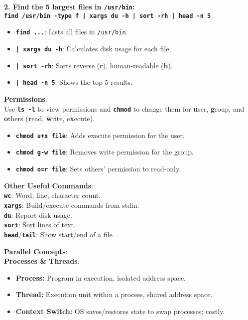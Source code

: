 \documentclass[10pt, a4paper]{article}
\newcommand{\cmd}[1]{\texttt{\textbf{#1}}}
\begin{document}
\begin{multicols}{3}
\vspace{1em} %

\textbf{2. Find the 5 largest files in \texttt{/usr/bin}:} \\
\cmd{find /usr/bin -type f | xargs du -h | sort -rh | head -n 5}
\begin{itemize}[nosep] %
    \item \cmd{find ...}: Lists all files in \texttt{/usr/bin}.
    \item \cmd{| xargs du -h}: Calculates disk usage for each file.
    \item \cmd{| sort -rh}: Sorts reverse (\textbf{r}), human-readable (\textbf{h}).
    \item \cmd{| head -n 5}: Shows the top 5 results.
\end{itemize}

\textbf{Permissions}: \\
Use \cmd{ls -l} to view permissions and \cmd{chmod} to change them for \textbf{u}ser, \textbf{g}roup, and \textbf{o}thers (\textbf{r}ead, \textbf{w}rite, e\textbf{x}ecute).
\begin{itemize}[nosep] %
    \item \cmd{chmod u+x file}: Adds execute permission for the user.
    \item \cmd{chmod g-w file}: Removes write permission for the group.
    \item \cmd{chmod o=r file}: Sets others' permission to read-only.
\end{itemize}

\vspace{1em} %

\textbf{Other Useful Commands}: \\
\cmd{wc}: Word, line, character count. \\
\cmd{xargs}: Build/execute commands from stdin. \\
\cmd{du}: Report disk usage. \\
\cmd{sort}: Sort lines of text. \\
\cmd{head}/\cmd{tail}: Show start/end of a file.



\textbf{Parallel Concepts}: \\
\textbf{Processes \& Threads}:
\begin{itemize}[nosep] %
    \item \textbf{Process:} Program in execution, isolated address space.
    \item \textbf{Thread:} Execution unit within a process, shared address space.
    \item \textbf{Context Switch:} OS saves/restores state to swap processes; costly.
\end{itemize}


\end{multicols}
\end{document}
